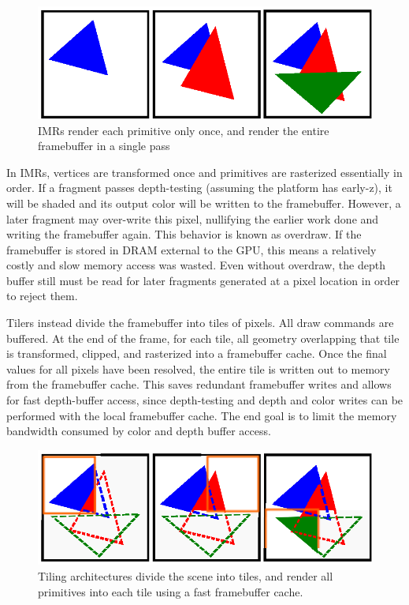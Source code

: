 \begin{figure}[h!]
    \caption{IMRs render each primitive only once, and render the entire framebuffer in a single pass}
    \centering
        \includegraphics{mccaffreyFigs/IMR.eps}
\end{figure}

In IMRs, vertices are transformed once and primitives are rasterized
essentially in order.  If a fragment passes depth-testing (assuming the
platform has early-z), it will be shaded and its output color will be written
to the framebuffer.
 However, a later fragment may over-write this pixel,
nullifying the earlier
 work done and writing the framebuffer again.  This
behavior is known as overdraw.  If the framebuffer is stored in DRAM external
to the GPU, this means a relatively costly and slow memory access was wasted.
Even without overdraw, the depth buffer still must be read for later fragments
generated at a pixel location in order to reject them.

Tilers instead divide the framebuffer into tiles of pixels.  All draw
commands
 are buffered.  At the end of the frame, for each tile, all
geometry overlapping that tile is transformed, clipped, and rasterized into a
framebuffer cache.  Once the final values for all pixels have been resolved,
the entire
 tile is written out to memory from the framebuffer cache.  This
saves redundant framebuffer writes and
 allows for fast depth-buffer access,
since depth-testing and depth and color writes can
 be performed with the
local framebuffer cache.  The end goal is to limit the
 memory bandwidth
consumed by color and depth buffer access.

\begin{figure}[h!]
    \caption{Tiling architectures divide the scene into tiles, and render all primitives into each tile using a fast framebuffer cache.}
    \centering
        \includegraphics{mccaffreyFigs/tiling.eps}
\end{figure}

